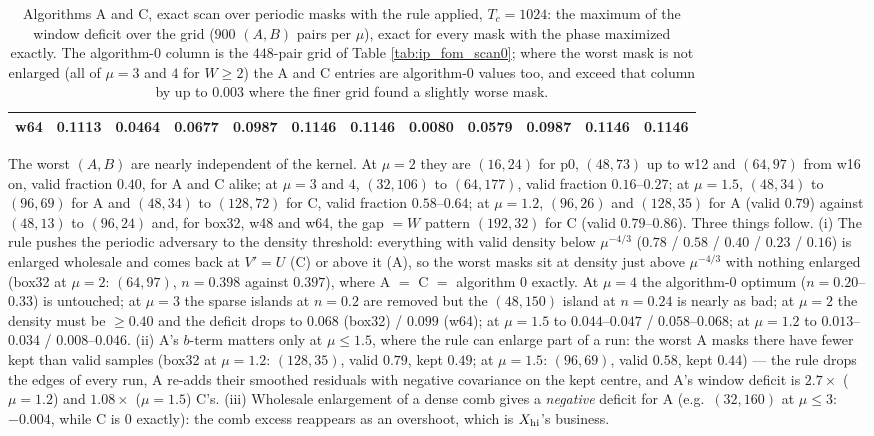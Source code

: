 \documentclass{article}
\numberwithin{equation}{section}   %
\begin{document}
\begin{table}[ht]
{\begin{tabular}{l c ccccc ccccc}
w64   & 0.1113 & 0.0464 & 0.0677 & 0.0987 & 0.1146 & 0.1146 & 0.0080 & 0.0579 & 0.0987 & 0.1146 & 0.1146 \\
\bottomrule
\end{tabular}}
\caption{Algorithms A and C, exact scan over periodic masks with the rule applied, $T_c = 1024$: the
maximum of the window deficit over the grid ($900$ $(A, B)$ pairs per $\mu$), exact for every mask with
the phase maximized exactly.  The algorithm-0 column is the $448$-pair grid of Table
\ref{tab:ip_fom_scan0}; where the worst mask is not enlarged (all of $\mu = 3$ and $4$ for $W \ge 2$) the
A and C entries are algorithm-0 values too, and exceed that column by up to $0.003$ where the finer
grid found a slightly worse mask.}
\label{tab:ip_fom_scanAC}
\end{table}

The worst $(A, B)$ are nearly independent of the kernel.  At $\mu = 2$ they are $(16, 24)$ for p0,
$(48, 73)$ up to w12 and $(64, 97)$ from w16 on, valid fraction $0.40$, for A and C alike; at $\mu = 3$ and
$4$, $(32, 106)$ to $(64, 177)$, valid fraction $0.16$--$0.27$; at $\mu = 1.5$, $(48, 34)$ to $(96, 69)$ for A
and $(48, 34)$ to $(128, 72)$ for C, valid fraction $0.58$--$0.64$; at $\mu = 1.2$, $(96, 26)$ and
$(128, 35)$ for A (valid $0.79$) against $(48, 13)$ to $(96, 24)$ and, for box32, w48 and w64, the
gap $= W$ pattern $(192, 32)$ for C (valid $0.79$--$0.86$).  Three things follow.  (i) The rule pushes
the periodic adversary to the density threshold: everything with valid density below $\mu^{-4/3}$
($0.78$ / $0.58$ / $0.40$ / $0.23$ / $0.16$) is enlarged wholesale and comes back at $V' = U$ (C) or above
it (A), so the worst masks sit at density just above $\mu^{-4/3}$ with nothing enlarged (box32 at
$\mu = 2$: $(64, 97)$, $n = 0.398$ against $0.397$), where A $=$ C $=$ algorithm 0 exactly.  At $\mu = 4$
the algorithm-0 optimum ($n = 0.20$--$0.33$) is untouched; at $\mu = 3$ the sparse islands at $n = 0.2$
are removed but the $(48, 150)$ island at $n = 0.24$ is nearly as bad; at $\mu = 2$ the density must be
$\ge 0.40$ and the deficit drops to $0.068$ (box32) / $0.099$ (w64); at $\mu = 1.5$ to $0.044$--$0.047$ /
$0.058$--$0.068$; at $\mu = 1.2$ to $0.013$--$0.034$ / $0.008$--$0.046$.  (ii) A's $b$-term matters only at
$\mu \le 1.5$, where the rule can enlarge part of a run: the worst A masks there have fewer kept than
valid samples (box32 at $\mu = 1.2$: $(128, 35)$, valid $0.79$, kept $0.49$; at $\mu = 1.5$: $(96, 69)$,
valid $0.58$, kept $0.44$) --- the rule drops the edges of every run, A re-adds their smoothed residuals
with negative covariance on the kept centre, and A's window deficit is $2.7\times$ ($\mu = 1.2$) and
$1.08\times$ ($\mu = 1.5$) C's.  (iii) Wholesale enlargement of a dense comb gives a {\em negative}
deficit for A (e.g.\ $(32, 160)$ at $\mu \le 3$: $-0.004$, while C is $0$ exactly): the comb excess
reappears as an overshoot, which is $X_{\rm hi}$'s business.
\end{document}
